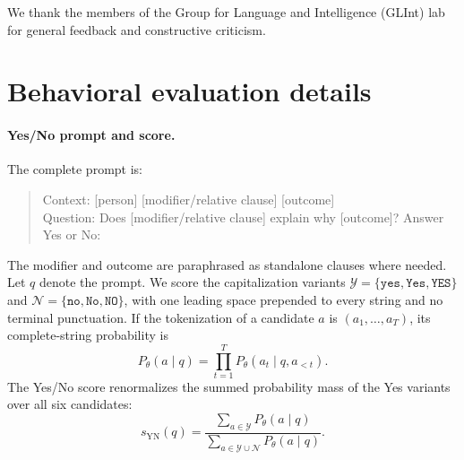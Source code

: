 \documentclass{article}
\begin{document}
\begin{ack}
We thank the members of the Group for Language and Intelligence (GLInt) lab for general feedback and constructive criticism.
\end{ack}




\normalsize
\clearpage
\appendix

\section{Behavioral evaluation details}
\label{app:behavior-details}

\paragraph{Yes/No prompt and score.}
The complete prompt is:
\begin{quote}\small\ttfamily
Context: [person] [modifier/relative clause] [outcome]\\
Question: Does [modifier/relative clause] explain why [outcome]? Answer Yes or No:
\end{quote}
The modifier and outcome are paraphrased as standalone clauses where needed. Let $q$ denote the prompt. We score the capitalization variants $\mathcal{Y}=\{\texttt{yes},\texttt{Yes},\texttt{YES}\}$ and $\mathcal{N}=\{\texttt{no},\texttt{No},\texttt{NO}\}$, with one leading space prepended to every string and no terminal punctuation. If the tokenization of a candidate $a$ is $(a_1,\ldots,a_T)$, its complete-string probability is
\begin{equation}
P_\theta(a\mid q)=\prod_{t=1}^{T}
P_\theta(a_t\mid q,a_{<t}).
\label{eq:answer-sequence-probability}
\end{equation}
The Yes/No score renormalizes the summed probability mass of the Yes variants over all six candidates:
\begin{equation}
s_{\mathrm{YN}}(q)=
\frac{\sum_{a\in\mathcal{Y}}P_\theta(a\mid q)}
{\sum_{a\in\mathcal{Y}\cup\mathcal{N}}P_\theta(a\mid q)}.
\label{eq:yes-probability}
\end{equation}
\end{document}
